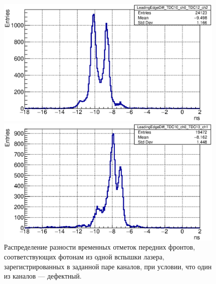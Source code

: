 \begin{figure}
\begin{minipage}[b]{0.495\textwidth}
\includegraphics[width=1.0\textwidth]{pictures/23_LeadingEdgeDiff_TDC10_ch0_TDC12_ch2_feb2017.eps}
\end{minipage}
\hspace{0.01\textwidth}
\begin{minipage}[b]{0.495\textwidth}
\includegraphics[width=1.0\textwidth]{pictures/23_LeadingEdgeDiff_TDC10_ch0_TDC13_ch1_feb2017.eps}
\end{minipage}
\caption{Распределение разности временных отметок передних фронтов, соответствующих фотонам из одной вспышки лазера, зарегистрированных в заданной паре каналов, при условии, что один из каналов --- дефектный.}
\label{fig:LeadingEdgeDiffMultiplePeaks}
\end{figure}

